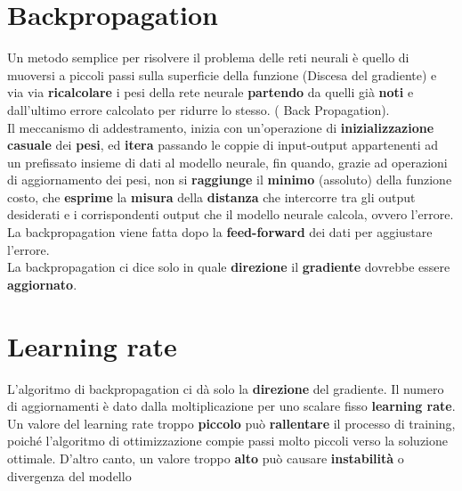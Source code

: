 \documentclass{article}
\begin{document}
\section{Backpropagation}
Un metodo semplice per risolvere il problema delle reti neurali è quello di muoversi a piccoli passi sulla superficie della funzione  (Discesa del gradiente)   e via via \textbf{ricalcolare} i pesi della rete neurale \textbf{partendo} da quelli già \textbf{noti} e dall’ultimo errore calcolato per ridurre lo stesso. ( Back Propagation).\\
Il meccanismo  di addestramento, inizia con  un’operazione di \textbf{inizializzazione} \textbf{casuale} dei \textbf{pesi}, ed \textbf{itera} passando  le coppie di input-output appartenenti ad un prefissato insieme di dati al modello neurale,  fin quando, grazie ad operazioni di aggiornamento dei pesi, non si \textbf{raggiunge} il \textbf{minimo} (assoluto) della  funzione costo, che \textbf{esprime} la \textbf{misura} della \textbf{distanza} che intercorre tra gli output desiderati e i corrispondenti output che il modello neurale calcola, ovvero l’errore. La backpropagation viene fatta dopo la \textbf{feed-forward} dei dati per aggiustare l'errore. \\
La backpropagation ci dice solo in quale \textbf{direzione} il \textbf{gradiente} dovrebbe essere \textbf{aggiornato}.

\section{Learning rate}
L'algoritmo di backpropagation ci dà solo la \textbf{direzione} del gradiente. Il numero di aggiornamenti è dato dalla moltiplicazione per uno scalare fisso \textbf{learning rate}.
Un valore del learning rate troppo \textbf{piccolo} può \textbf{rallentare} il processo di training, poiché l'algoritmo di ottimizzazione compie passi molto piccoli verso la soluzione ottimale. D'altro canto, un valore troppo \textbf{alto} può causare \textbf{instabilità} o divergenza del modello
\end{document}
